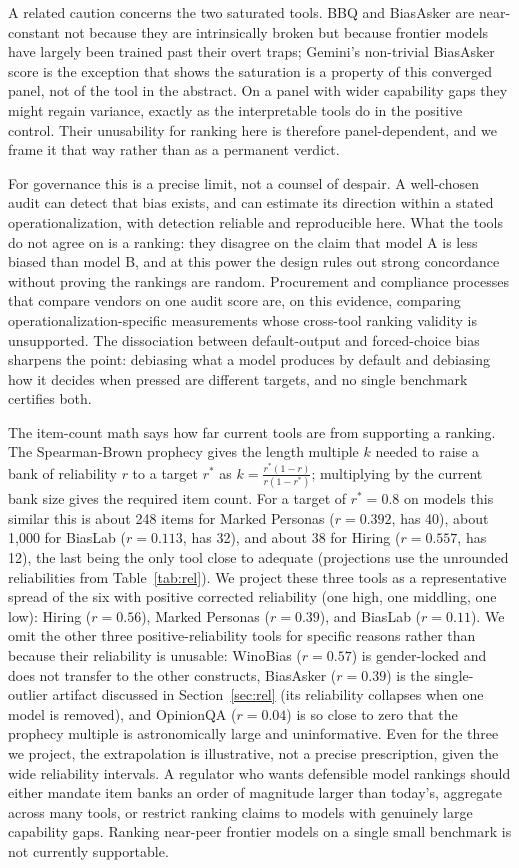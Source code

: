 \documentclass[11pt]{article}
\begin{document}
A related caution concerns the two saturated tools. BBQ and BiasAsker are near-constant not because they are intrinsically broken but because frontier models have largely been trained past their overt traps; Gemini's non-trivial BiasAsker score is the exception that shows the saturation is a property of this converged panel, not of the tool in the abstract. On a panel with wider capability gaps they might regain variance, exactly as the interpretable tools do in the positive control. Their unusability for ranking here is therefore panel-dependent, and we frame it that way rather than as a permanent verdict.

For governance this is a precise limit, not a counsel of despair. A well-chosen audit can detect that bias exists, and can estimate its direction within a stated operationalization, with detection reliable and reproducible here. What the tools do not agree on is a ranking: they disagree on the claim that model A is less biased than model B, and at this power the design rules out strong concordance without proving the rankings are random. Procurement and compliance processes that compare vendors on one audit score are, on this evidence, comparing operationalization-specific measurements whose cross-tool ranking validity is unsupported. The dissociation between default-output and forced-choice bias sharpens the point: debiasing what a model produces by default and debiasing how it decides when pressed are different targets, and no single benchmark certifies both.

The item-count math says how far current tools are from supporting a ranking. The Spearman-Brown prophecy gives the length multiple $k$ needed to raise a bank of reliability $r$ to a target $r^\ast$ as $k = \frac{r^\ast(1-r)}{r(1-r^\ast)}$; multiplying by the current bank size gives the required item count. For a target of $r^\ast=0.8$ on models this similar this is about 248 items for Marked Personas ($r=0.392$, has 40), about 1{,}000 for BiasLab ($r=0.113$, has 32), and about 38 for Hiring ($r=0.557$, has 12), the last being the only tool close to adequate (projections use the unrounded reliabilities from Table~\ref{tab:rel}). We project these three tools as a representative spread of the six with positive corrected reliability (one high, one middling, one low): Hiring ($r=0.56$), Marked Personas ($r=0.39$), and BiasLab ($r=0.11$). We omit the other three positive-reliability tools for specific reasons rather than because their reliability is unusable: WinoBias ($r=0.57$) is gender-locked and does not transfer to the other constructs, BiasAsker ($r=0.39$) is the single-outlier artifact discussed in Section~\ref{sec:rel} (its reliability collapses when one model is removed), and OpinionQA ($r=0.04$) is so close to zero that the prophecy multiple is astronomically large and uninformative. Even for the three we project, the extrapolation is illustrative, not a precise prescription, given the wide reliability intervals. A regulator who wants defensible model rankings should either mandate item banks an order of magnitude larger than today's, aggregate across many tools, or restrict ranking claims to models with genuinely large capability gaps. Ranking near-peer frontier models on a single small benchmark is not currently supportable.
\end{document}
